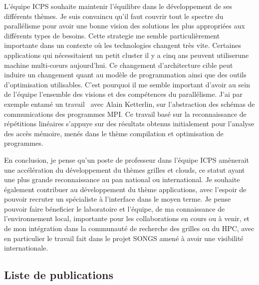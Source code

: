 \documentclass[11pt]{article}
\begin{document}
L'équipe ICPS souhaite maintenir l'équilibre dans le développement de ses
différents thèmes. Je suis convaincu qu'il faut couvrir tout le spectre du
parallélisme pour avoir une bonne vision des solutions les plus appropriées
aux différents types de besoins. Cette strategie me semble particulièrement
importante dans un contexte où les technologies changent très vite. Certaines
applications qui nécessitaient un petit cluster il y a cinq ans peuvent 
utiliserune machine multi-c{\oe}urs aujourd'hui. Ce changement d'architecture 
cible peut induire un changement quant au modèle de programmation ainsi que 
des outils d'optimisation utilisables. C'est pourquoi il me semble important
d'avoir au sein de l'équipe l'ensemble des visions et des compétences du
parallélisme. J'ai par exemple entamé un travail~\cite{ketterlin11} avec 
Alain Ketterlin, sur l'abstraction des schémas de communications des 
programmes MPI. Ce travail basé sur la reconnaissance de répétitions 
linéaires s'appuye sur des résultats obtenus initialement pour l'analyse des 
accès mémoire, menés dans le thème compilation et optimisation de programmes.

En conclusion, je pense qu'un poste de professeur dans l'équipe ICPS amènerait
une accélération du développement du thèmes grilles et clouds, ce statut
ayant une plus grande reconnaissance au pan national ou international. 
Je souhaite également contribuer au développement du thème applications,
avec l'espoir de pouvoir recruter un spécialiste à l'interface dans le 
moyen terme. Je pense pouvoir faire  béneficier le laboratoire et l'équipe, de 
ma connaissance de l'environnement local, importante pour les collaborations en 
cours ou à venir, et de mon intégration dans la communauté de recherche des
grilles ou du HPC, avec en particulier le travail fait dans le projet SONGS
amené à avoir une visibilité internationale.


\newpage

\subsection{Liste de publications}
\end{document}
